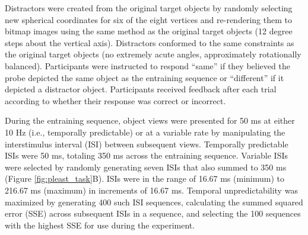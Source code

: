 \documentclass[dwyatte_dissertation.tex]{subfiles}
\begin{document}
Distractors were created from the original target objects by randomly selecting new spherical coordinates for six of the eight vertices and re-rendering them to bitmap images using the same method as the original target objects (12 degree steps about the vertical axis). Distractors conformed to the same constraints as the original target objects (no extremely acute angles, approximately rotationally balanced). Participants were instructed to respond ``same'' if they believed the probe depicted the same object as the entraining sequence or ``different'' if it depicted a distractor object. Participants received feedback after each trial according to whether their response was correct or incorrect. %

During the entraining sequence, object views were presented for 50 ms at either 10 Hz (i.e., temporally predictable) or at a variable rate by manipulating the interstimulus interval (ISI) between subsequent views. Temporally predictable ISIs were 50 ms, totaling 350 ms across the entraining sequence. Variable ISIs were selected by randomly generating seven ISIs that also summed to 350 ms (Figure \ref{fig:pleast_task}B). ISIs were in the range of 16.67 ms (minimum) to 216.67 ms (maximum) in increments of 16.67 ms. Temporal unpredictability was maximized by generating 400 such ISI sequences, calculating the summed squared error (SSE) across subsequent ISIs in a sequence, and selecting the 100 sequences with the highest SSE for use during the experiment.
\end{document}
